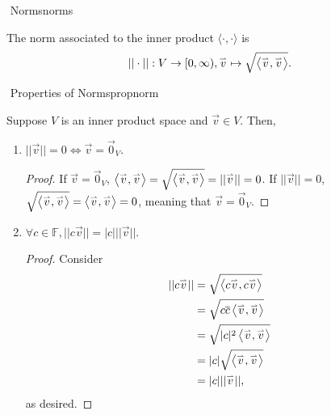         \begin{definition}{\Stop\,\,Norms}{norms}

            The norm associated to the inner product \(\langle\cdot,\cdot\rangle\) is
            \begin{equation*}
                ||\cdot||:V\to[0,\infty),\overset{_{\rightharpoonup}}{v}\mapsto\sqrt{\left\langle \overset{_{\rightharpoonup}}{v},\overset{_{\rightharpoonup}}{v}\right\rangle}.
            \end{equation*}
            
        \end{definition}
        \pagebreak
        \begin{theorem}{\Stop\,\,Properties of Norms}{propnorm}

            Suppose \(V\) is an inner product space and \(\vec{v}\in V\). Then,
            \begin{enumerate}
                \item \(||\vec{v}||=0\iff\vec{v}=\vec{0}_V\).
                \begin{proof}
                    If \(\vec{v}=\vec{0}_V\), \(\left\langle \overset{_{\rightharpoonup}}{v},\overset{_{\rightharpoonup}}{v}\right\rangle=\sqrt{\left\langle \overset{_{\rightharpoonup}}{v},\overset{_{\rightharpoonup}}{v}\right\rangle}=||\overset{_{\rightharpoonup}}{v}||=0\). If \(||\vec{v}||=0\), \(\sqrt{\left\langle \overset{_{\rightharpoonup}}{v},\overset{_{\rightharpoonup}}{v}\right\rangle}=\left\langle \overset{_{\rightharpoonup}}{v},\overset{_{\rightharpoonup}}{v}\right\rangle=0\), meaning that \(\vec{v}=\vec{0}_V\).
                \end{proof}
                \item \(\forall c\in\mathbb{F},||c\vec{v}||=|c|||\vec{v}||\).
                \begin{proof}
                    Consider
                    \begin{align*}
                        ||c\overset{_{\rightharpoonup}}{v}||&=\sqrt{\left\langle c\overset{_{\rightharpoonup}}{v},c\overset{_{\rightharpoonup}}{v}\right\rangle} \\
                        &=\sqrt{c\overline{c}\left\langle \overset{_{\rightharpoonup}}{v},\overset{_{\rightharpoonup}}{v}\right\rangle} \\
                        &=\sqrt{|c|^2\left\langle \overset{_{\rightharpoonup}}{v},\overset{_{\rightharpoonup}}{v}\right\rangle} \\
                        &=|c|\sqrt{\left\langle \overset{_{\rightharpoonup}}{v},\overset{_{\rightharpoonup}}{v}\right\rangle} \\
                        &=|c|||\overset{_{\rightharpoonup}}{v}||,
                    \end{align*}
                    as desired.
                \end{proof}
            \end{enumerate}
            
        \end{theorem}
        \vphantom
        \\
        \\
